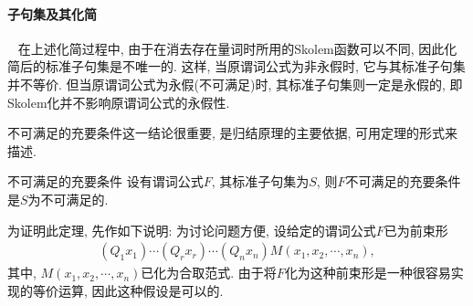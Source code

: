 \paragraph{子句集及其化简}~{}
在上述化简过程中, 由于在消去存在量词时所用的Skolem函数可以不同, 因此化简后的标准子句集是不唯一的.
这样, 当原谓词公式为非永假时, 它与其标准子句集并不等价. 但当原谓词公式为永假(不可满足)时, 其标准子句集则一定是永假的, 即Skolem化并不影响原谓词公式的永假性.

不可满足的充要条件这一结论很重要, 是归结原理的主要依据, 可用定理的形式来描述.

\begin{mythm}{不可满足的充要条件}{}\label{AIthm3.1}
设有谓词公式$F$, 其标准子句集为$S$, 则$F$不可满足的充要条件是$S$为不可满足的.
\end{mythm}

为证明此定理, 先作如下说明:  为讨论问题方便, 设给定的谓词公式$F$已为前束形
\begin{align}
    (Q_1x_1)\cdots (Q_rx_r)\cdots (Q_nx_n)M(x_1,x_2,\cdots,x_n),
\end{align}
其中, $M(x_1,x_2,\cdots,x_n)$已化为合取范式. 由于将$F$化为这种前束形是一种很容易实现的等价运算, 因此这种假设是可以的.

